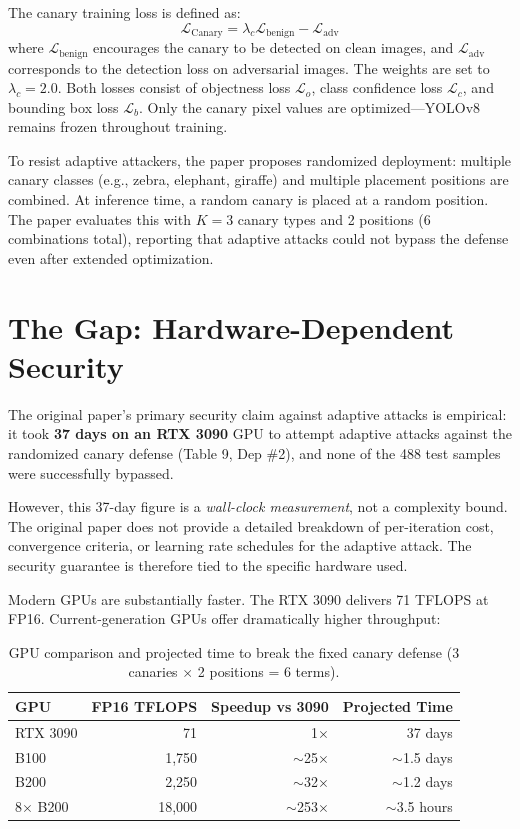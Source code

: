 \documentclass[11pt,a4paper]{article}
\begin{document}
The canary training loss is defined as:
\begin{equation}
    \mathcal{L}_{\text{Canary}} = \lambda_c \mathcal{L}_{\text{benign}} - \mathcal{L}_{\text{adv}}
\end{equation}
where $\mathcal{L}_{\text{benign}}$ encourages the canary to be detected on clean images, and $\mathcal{L}_{\text{adv}}$ corresponds to the detection loss on adversarial images. The weights are set to $\lambda_c = 2.0$. Both losses consist of objectness loss $\mathcal{L}_o$, class confidence loss $\mathcal{L}_c$, and bounding box loss $\mathcal{L}_b$. Only the canary pixel values are optimized---YOLOv8 remains frozen throughout training.

To resist adaptive attackers, the paper proposes randomized deployment: multiple canary classes (e.g., zebra, elephant, giraffe) and multiple placement positions are combined. At inference time, a random canary is placed at a random position. The paper evaluates this with $K=3$ canary types and 2 positions (6 combinations total), reporting that adaptive attacks could not bypass the defense even after extended optimization.

\section{The Gap: Hardware-Dependent Security}

The original paper's primary security claim against adaptive attacks is empirical: it took \textbf{37 days on an RTX 3090} GPU to attempt adaptive attacks against the randomized canary defense (Table 9, Dep \#2), and none of the 488 test samples were successfully bypassed.

However, this 37-day figure is a \textit{wall-clock measurement}, not a complexity bound. The original paper does not provide a detailed breakdown of per-iteration cost, convergence criteria, or learning rate schedules for the adaptive attack. The security guarantee is therefore tied to the specific hardware used.

Modern GPUs are substantially faster. The RTX 3090 delivers 71 TFLOPS at FP16. Current-generation GPUs offer dramatically higher throughput:

\begin{table}[H]
\centering
\caption{GPU comparison and projected time to break the fixed canary defense (3 canaries $\times$ 2 positions = 6 terms).}
\begin{tabular}{lrrr}
\toprule
\textbf{GPU} & \textbf{FP16 TFLOPS} & \textbf{Speedup vs 3090} & \textbf{Projected Time} \\
\midrule
RTX 3090 & 71 & 1$\times$ & 37 days \\
B100 & 1,750 & $\sim$25$\times$ & $\sim$1.5 days \\
B200 & 2,250 & $\sim$32$\times$ & $\sim$1.2 days \\
8$\times$ B200 & 18,000 & $\sim$253$\times$ & $\sim$3.5 hours \\
\bottomrule
\end{tabular}
\label{tab:gpu_comparison}
\end{table}
\end{document}
